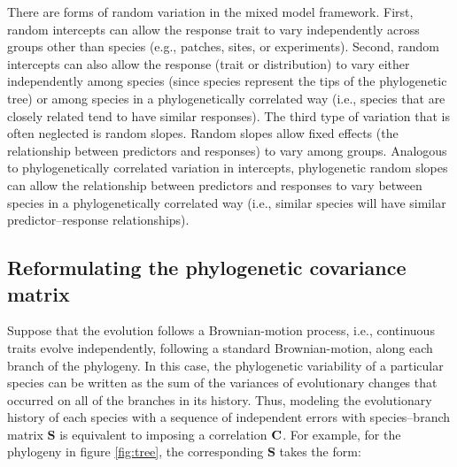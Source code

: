 \documentclass[12pt]{article}
\begin{document}
There are forms of random variation in the mixed model framework.
First, random intercepts can allow the response trait to vary independently across groups other than species (e.g., patches, sites, or experiments). 
Second, random intercepts can also allow the response (trait or distribution) to vary either independently among species (since species represent the tips of the phylogenetic tree) or among species in a phylogenetically correlated way (i.e., species that are closely related tend to have similar responses).
The third type of variation that is often neglected is random slopes.
Random slopes allow fixed effects (the relationship between predictors and responses) to vary among groups.
Analogous to phylogenetically correlated variation in intercepts, phylogenetic random slopes can allow the relationship between predictors and responses to vary between species in a phylogenetically correlated way (i.e., similar species will have similar predictor--response relationships).


\subsection*{Reformulating the phylogenetic covariance matrix}


\newcommand{\bS}{{\mathbf S}}
\newcommand{\bJ}{{\mathbf J}}
\newcommand{\bB}{{\mathbf B}}
\newcommand{\bBadj}{{\mathbf B}_{\mbox{\tiny adj}}}
\newcommand{\bomega}{{\boldsymbol \omega}}
\newcommand{\bell}{{\boldsymbol \ell}}
\newcommand{\e}{{ \epsilon}}

Suppose that the evolution follows a Brownian-motion process, i.e., continuous traits evolve independently, following a standard Brownian-motion, along each branch of the phylogeny.
In this case, the phylogenetic variability of a particular species can be written as the sum of the variances of evolutionary changes that occurred on all of the branches in its history. 
Thus, modeling the evolutionary history of each species with a sequence of independent errors with species--branch matrix $\bS$ is equivalent to imposing a correlation ${\mathbf C}$.
For example, for the phylogeny in figure \ref{fig:tree}, the corresponding $\bS$ takes the form:
\end{document}
